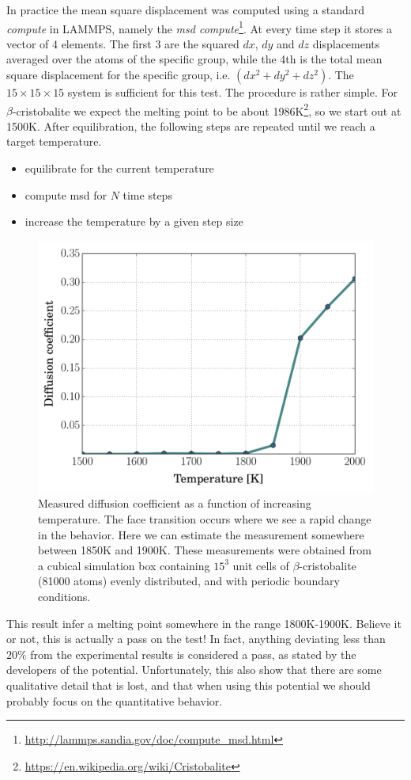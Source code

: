 \documentclass[twoside,english]{uiofysmaster}
\begin{document}
In practice the mean square displacement was computed using a standard \textit{compute} in LAMMPS, namely the \textit{msd compute}\footnote{\url{http://lammps.sandia.gov/doc/compute_msd.html}}. 
At every time step it stores a vector of 4 elements. 
The first 3 are the squared $dx$, $dy$ and $dz$ displacements averaged over the atoms of the specific group, while the 4th is the total mean square displacement for the specific group, i.e. $(dx^2 + dy^2 + dz^2)$. 
The $15\times15\times15$ system is sufficient for this test. The procedure is rather simple. For $\beta$-cristobalite we expect the melting point to be about 1986K\footnote{\url{https://en.wikipedia.org/wiki/Cristobalite}}, so we start out at 1500K. After equilibration, the following steps are repeated until we reach a target temperature. 
\begin{itemize}
	\item equilibrate for the current temperature
	\item compute msd for $N$ time steps
	\item increase the temperature by a given step size
\end{itemize}

\begin{figure}[H]
\centering
\includegraphics[width=0.7\linewidth]{../SiO2/msd/figures/msd}
\caption{Measured diffusion coefficient as a function of increasing temperature. 
	The face transition occurs where we see a rapid change in the behavior. 
	Here we can estimate the measurement somewhere between 1850K and 1900K. 
	These measurements were obtained from a cubical simulation box containing $15^3$ unit cells of $\beta$-cristobalite (81000 atoms) evenly distributed, and with periodic boundary conditions.}
\label{fig:msd}
\end{figure}
This result infer a melting point somewhere in the range 1800K-1900K. 
Believe it or not, this is actually a pass on the test! 
In fact, anything deviating less than $20\%$ from the experimental results is considered a pass, as stated by the developers of the potential. 
Unfortunately, this also show that there are some qualitative detail that is lost, and that when using this potential we should probably focus on the quantitative behavior. 
\end{document}
